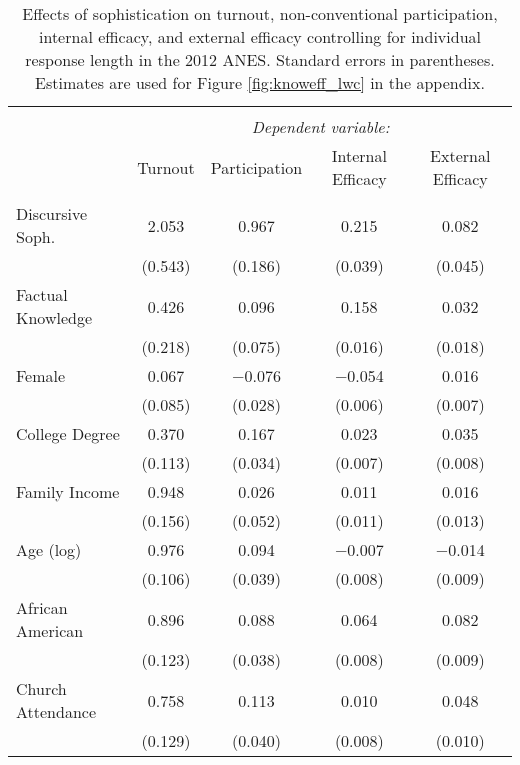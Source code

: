 
\begin{table}[!htbp] \centering 
  \caption[Effects of sophistication on turnout, non-conventional participation, internal efficacy, 
  and external efficacy controlling for individual response length in the 2012 ANES]{Effects of sophistication on turnout, non-conventional participation, internal efficacy, 
          and external efficacy controlling for individual response length in the 2012 ANES. 
          Standard errors in parentheses. Estimates are used for Figure \ref{fig:knoweff_lwc} 
          in the appendix.} 
  \label{tab:knoweff2012_lwc} 
\begin{tabular}{@{\extracolsep{0pt}}lcccc} 
\\[-1.8ex]\hline 
\hline \\[-1.8ex] 
 & \multicolumn{4}{c}{\textit{Dependent variable:}} \\ 
\cline{2-5} 
 & Turnout & Participation & Internal Efficacy & External Efficacy \\ 
\hline \\[-1.8ex] 
 Discursive Soph. & 2.053 & 0.967 & 0.215 & 0.082 \\ 
  & (0.543) & (0.186) & (0.039) & (0.045) \\ 
  Factual Knowledge & 0.426 & 0.096 & 0.158 & 0.032 \\ 
  & (0.218) & (0.075) & (0.016) & (0.018) \\ 
  Female & 0.067 & $-$0.076 & $-$0.054 & 0.016 \\ 
  & (0.085) & (0.028) & (0.006) & (0.007) \\ 
  College Degree & 0.370 & 0.167 & 0.023 & 0.035 \\ 
  & (0.113) & (0.034) & (0.007) & (0.008) \\ 
  Family Income & 0.948 & 0.026 & 0.011 & 0.016 \\ 
  & (0.156) & (0.052) & (0.011) & (0.013) \\ 
  Age (log) & 0.976 & 0.094 & $-$0.007 & $-$0.014 \\ 
  & (0.106) & (0.039) & (0.008) & (0.009) \\ 
  African American & 0.896 & 0.088 & 0.064 & 0.082 \\ 
  & (0.123) & (0.038) & (0.008) & (0.009) \\ 
  Church Attendance & 0.758 & 0.113 & 0.010 & 0.048 \\ 
  & (0.129) & (0.040) & (0.008) & (0.010) \\ 

\end{tabular}
\end{table}
